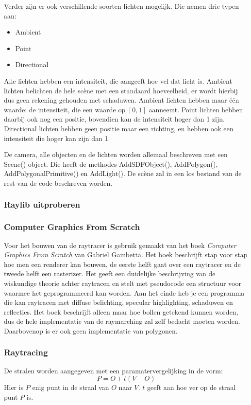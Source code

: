 \documentclass[12pt, a4paper]{article}
\begin{document}
Verder zijn er ook verschillende soorten lichten mogelijk. Die nemen drie typen aan:
\begin{itemize}
	\item Ambient
	\item Point
	\item Directional
\end{itemize}
Alle lichten hebben een intensiteit, die aangeeft hoe vel dat licht is. Ambient lichten belichten de hele scène met een standaard hoeveelheid, er wordt hierbij dus geen rekening gehouden met schaduwen. Ambient lichten hebben maar één waarde: de intensiteit, die een waarde op \([0, 1]\) aanneemt. Point lichten hebben daarbij ook nog een positie, bovendien kan de intensiteit hoger dan 1 zijn. Directional lichten hebben geen positie maar een richting, en hebben ook een intensiteit die hoger kan zijn dan 1.

De camera, alle objecten en de lichten worden allemaal beschreven met een Scene() object. Die heeft de methodes AddSDFObject(), AddPolygon(), AddPolygonalPrimitive() en AddLight(). De scène zal in een los bestand van de rest van de code beschreven worden.
\subsubsection{Raylib uitproberen}
\subsubsection{Computer Graphics From Scratch}
Voor het bouwen van de raytracer is gebruik gemaakt van het boek \emph{Computer Graphics From Scratch} \cite{ComputerGraphicsFromScratch} van Gabriel Gambetta. Het boek beschrijft stap voor stap hoe men een renderer kan bouwen, de eerste helft gaat over een raytracer en de tweede helft een rasterizer. Het geeft een duidelijke beschrijving van de wiskundige theorie achter raytracen en stelt met pseudocode een structuur voor waarmee het geprogrammeerd kan worden. Aan het einde heb je een programma die kan raytracen met diffuse belichting, specular highlighting, schaduwen en reflecties. Het boek beschrijft alleen maar hoe bollen getekend kunnen worden, dus de hele implementatie van de raymarching zal zelf bedacht moeten worden. Daarbovenop is er ook geen implementatie van polygonen. 
\subsubsection{Raytracing}
De stralen worden aangegeven met een paramatervergelijking in de vorm:
\[P=O+t(V-O)\]
Hier is $P$ enig punt in de straal van $O$ naar $V$. $t$ geeft aan hoe ver op de straal punt $P$ is.
\end{document}

